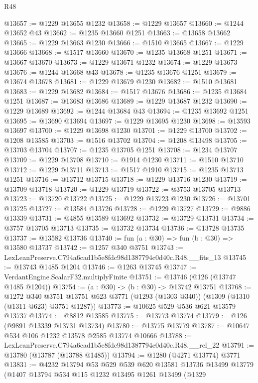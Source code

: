 \begin{lexlean}{R48}
\begin{coremodule}
@13657 := @1229 @13655 @1232
@13658 := @1229 @13657
@13660 := @1244 @13652 @43
@13662 := @1235 @13660 @1251
@13663 := @13658 @13662
@13665 := @1229 @13663 @1230
@13666 := @1510 @13665
@13667 := @1229 @13666
@13668 := @1517 @13660
@13670 := @1235 @13668 @1251
@13671 := @13667 @13670
@13673 := @1229 @13671 @1232
@13674 := @1229 @13673
@13676 := @1244 @13668 @43
@13678 := @1235 @13676 @1251
@13679 := @13674 @13678
@13681 := @1229 @13679 @1230
@13682 := @1510 @13681
@13683 := @1229 @13682
@13684 := @1517 @13676
@13686 := @1235 @13684 @1251
@13687 := @13683 @13686
@13689 := @1229 @13687 @1232
@13690 := @1229 @13689
@13692 := @1244 @13684 @43
@13694 := @1235 @13692 @1251
@13695 := @13690 @13694
@13697 := @1229 @13695 @1230
@13698 := @13593 @13697
@13700 := @1229 @13698 @1230
@13701 := @1229 @13700
@13702 := @1208 @13585
@13703 := @1516 @13702
@13704 := @1208 @13498
@13705 := @13703 @13704
@13707 := @1235 @13705 @1251
@13708 := @1234 @13707
@13709 := @1229 @13708
@13710 := @1914 @1230
@13711 := @1510 @13710
@13712 := @1229 @13711
@13713 := @1517 @1910
@13715 := @1235 @13713 @1251
@13716 := @13712 @13715
@13718 := @1229 @13716 @1230
@13719 := @13709 @13718
@13720 := @1229 @13719
@13722 := @3753 @13705 @13713
@13723 := @13720 @13722
@13725 := @1229 @13723 @1230
@13726 := @13701 @13725
@13727 := @13584 @13726
@13728 := @1229 @13727
@13729 := @9886 @13339
@13731 := @4855 @13589 @13692
@13732 := @13729 @13731
@13734 := @3757 @13705 @13713
@13735 := @13732 @13734
@13736 := @13728 @13735
@13737 := @13582 @13736
@13740 := fun (a : @30) => fun (b : @30) => @13580 @13737
@13742 := @1257 @340 @3751
@13743 := LexLeanPreserve.C794a6cad1b5e8fdc98d1387794c0d40c.R48.__fits_13
@13745 := @13743 @1485 @1204
@13746 := @1263 @13745
@13747 := VerdantEngine.ScalarF32.multiplyFinite
@13751 := @13746 (@126 (@13747 @1485 @1204))
@13754 := (a : @30) -> (b : @30) -> @13742 @13751
@13768 := @1272
    @340
    @3751
    @13751
    @623
    @3771
    (@1293 (@1303 @340))
    (@1309 (@1310 (@1311 @623) @3751 @1287))
@13773 := @10625 @529 @536 @621 @13579 @13737
@13774 := @8812 @13585
@13775 := @13773 @13774
@13779 := @126 (@9891 @13339 @13731 @13734)
@13780 := @13775 @13779
@13787 := @10647 @534 @106 @1232 @13578 @2585 @13774 @10666
@13788 := LexLeanPreserve.C794a6cad1b5e8fdc98d1387794c0d40c.R48.__rel_22
@13791 := @13780 (@13787 (@13788 @1485))
@13794 := @1280 (@4271 @13774) @3771
@13831 := @4232
    @13794
    @53
    @529
    @539
    @620
    @13581
    @13736
    @13499
    @13779
    (@1407
      @13794
      @534
      @115
      @1232
      @13495
      @1261
      @13499
      (@1329

\end{coremodule}
\end{lexlean}
